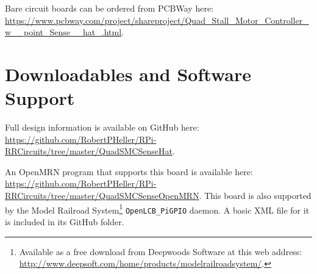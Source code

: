 Bare circuit boards can be ordered from PCBWay here: 
\url{https://www.pcbway.com/project/shareproject/Quad_Stall_Motor_Controller_w__point_Sense__hat_.html}.

\section{Downloadables and Software Support}

Full design information is available on GitHub here:
\url{https://github.com/RobertPHeller/RPi-RRCircuits/tree/master/QuadSMCSenseHat}.

An OpenMRN program that supports this board is available here:
\url{https://github.com/RobertPHeller/RPi-RRCircuits/tree/master/QuadSMCSenseOpenMRN}.
This board is also supported by the Model Railroad System\footnote{Available
as a free download from Deepwoods Software at this web address:
\url{http://www.deepsoft.com/home/products/modelrailroadsystem/}.}
\texttt{OpenLCB\_PiGPIO} daemon. A basic XML file for it is included in its
GitHub folder.


